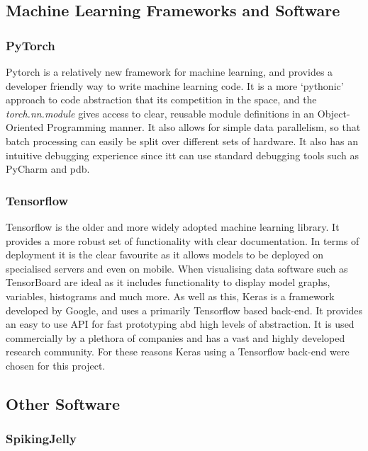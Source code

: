 \subsection{Machine Learning Frameworks and Software}

\subsubsection{PyTorch}

Pytorch\cite{Pytorch} is a relatively new framework for machine learning, and provides a developer friendly way to write machine learning code. It is a more `pythonic' approach to code abstraction that its competition in the space, and the \emph{torch.nn.module} gives access to clear, reusable module definitions in an Object-Oriented Programming manner. It also allows for simple data parallelism, so that batch processing can easily be split over different sets of hardware. It also has an intuitive debugging experience since itt can use standard debugging tools such as PyCharm and pdb.

\subsubsection{Tensorflow}

Tensorflow\cite{Tensorflow} is the older and more widely adopted machine learning library. It provides a more robust set of functionality with clear documentation. In terms of deployment it is the clear favourite as it allows models to be deployed on specialised servers and even on mobile. When visualising data software such as TensorBoard are ideal as it includes functionality to display model graphs, variables, histograms and much more. As well as this, Keras\cite{Keras} is a framework developed by Google, and uses a primarily Tensorflow based back-end. It provides an easy to use API for fast prototyping abd high levels of abstraction. It is used commercially by a plethora of companies and has a vast and highly developed research community. For these reasons Keras using a Tensorflow back-end were chosen for this project.

\subsection{Other Software}

\subsubsection{SpikingJelly}

